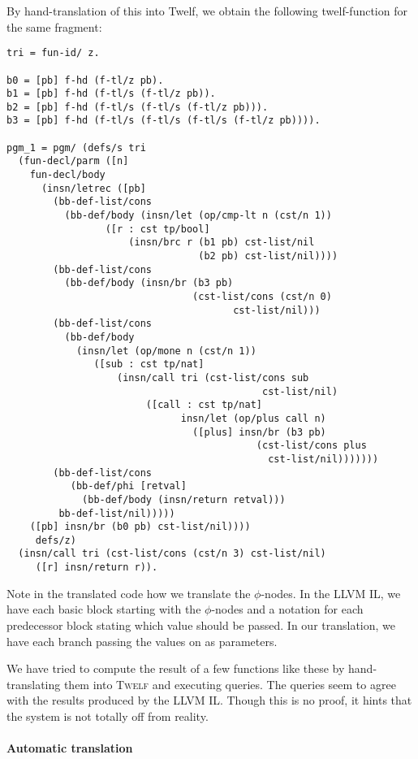 \documentclass[a4paper, oneside, 10pt, draft]{memoir}
\newcommand{\twelf}{\textsc{Twelf}}
\begin{document}
By hand-translation of this into Twelf, we obtain the following
twelf-function for the same fragment:
\begin{verbatim}
tri = fun-id/ z.

b0 = [pb] f-hd (f-tl/z pb).
b1 = [pb] f-hd (f-tl/s (f-tl/z pb)).
b2 = [pb] f-hd (f-tl/s (f-tl/s (f-tl/z pb))).
b3 = [pb] f-hd (f-tl/s (f-tl/s (f-tl/s (f-tl/z pb)))).

pgm_1 = pgm/ (defs/s tri
  (fun-decl/parm ([n]
    fun-decl/body
      (insn/letrec ([pb]
        (bb-def-list/cons
          (bb-def/body (insn/let (op/cmp-lt n (cst/n 1))
    		     ([r : cst tp/bool]
                     (insn/brc r (b1 pb) cst-list/nil
                                 (b2 pb) cst-list/nil))))
        (bb-def-list/cons
          (bb-def/body (insn/br (b3 pb)
                                (cst-list/cons (cst/n 0)
                                       cst-list/nil)))
        (bb-def-list/cons
          (bb-def/body
    	    (insn/let (op/mone n (cst/n 1))
    	       ([sub : cst tp/nat]
                   (insn/call tri (cst-list/cons sub
                                            cst-list/nil)
                        ([call : cst tp/nat]
                              insn/let (op/plus call n)
                                ([plus] insn/br (b3 pb)
                                           (cst-list/cons plus
                                             cst-list/nil)))))))
        (bb-def-list/cons
           (bb-def/phi [retval]
    	     (bb-def/body (insn/return retval)))
         bb-def-list/nil)))))
    ([pb] insn/br (b0 pb) cst-list/nil))))
     defs/z)
  (insn/call tri (cst-list/cons (cst/n 3) cst-list/nil)
     ([r] insn/return r)).
\end{verbatim}

Note in the translated code how we translate the $\phi$-nodes. In the
LLVM IL, we have each basic block starting with the $\phi$-nodes and a
notation for each predecessor block stating which value should be
passed. In our translation, we have each branch passing the values on
as parameters.

We have tried to compute the result of a few functions like these by
hand-translating them into \twelf{} and executing queries. The queries
seem to agree with the results produced by the LLVM IL. Though this is
no proof, it hints that the system is not totally off from reality.

\paragraph{Automatic translation}
\end{document}
